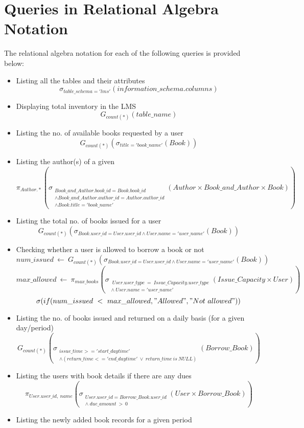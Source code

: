 \documentclass{article}
\begin{document}
\section{Queries in Relational Algebra Notation}
The relational algebra notation for each of the following queries is provided below:
\begin{itemize}
    \item Listing all the tables and their attributes
    \[\sigma_{table\_schema='lms'} (information\_schema.columns)\]
    \item Displaying total inventory in the LMS
    \[G_{count(*)}(table\_name)\]
    \item Listing the no. of available books requested by a user
    \[G_{count(*)}(\sigma_{title = 'book\_name'}(Book))\]
    \item Listing the author(s) of a given 
    \[\pi_{Author.*}(\sigma_{\substack{Book\_and\_Author.book\_id = Book.book\_id \\ \wedge Book\_and\_Author.author\_id = Author.author\_id \\ \wedge Book.title = 'book\_name' }}(Author \times Book\_and\_Author \times Book))\]
    \item Listing the total no. of books issued for a user
    \[G_{count(*)}(\sigma_{Book.user\_id = User.user\_id \wedge User.name = 'user\_name'}(Book))\]
    \item Checking whether a user is allowed to borrow a book or not
    \[num\_issued \ \leftarrow \ G_{count(*)}(\sigma_{Book.user\_id = User.user\_id \wedge User.name = 'user\_name'}(Book))\]
    \[max\_allowed \ \leftarrow \ \pi_{max\_books}(\sigma_{\substack{\ User.user\_type \ = \ Issue\_Capacity.user\_type \\ \wedge \ User.name = 'user\_name'}}(Issue\_Capacity \times User))\]
    \[\sigma (if(num\_issued \ < \ max\_allowed, "Allowed", "Not \ allowed"))\]
    \item Listing the no. of books issued and returned on a daily basis (for a given day/period)
    \[G_{count(*)}(\sigma_{\substack{issue\_time >= 'start\_daytime' \\ \wedge (return\_time <= 'end\_daytime'\ \vee \ return\_time \ is \ NULL) }}(Borrow\_Book))\]
    \item Listing the users with book details if there are any dues
    \[\pi_{User.user\_id,\ name}(\sigma_{\substack{User.user\_id = Borrow\_Book.user\_id \\ \wedge \ due\_amount \ > \ 0 }}(User \times Borrow\_Book))\]
    \item Listing the newly added book records for a given period

\end{itemize}
\end{document}
